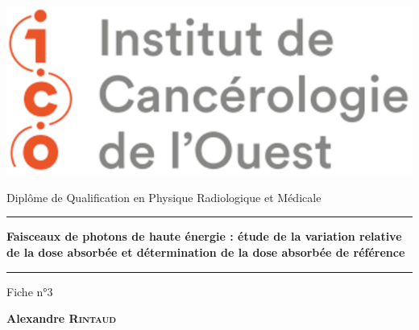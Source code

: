 \begin{titlepage}

    \unitlength 1cm
    \begin{center}
    
    \vspace*{1cm}
    

    \includegraphics[scale=0.6]{figures/logo_ico.png}
    
    \vspace{2cm}
    
               {\Large Diplôme de Qualification en Physique Radiologique et Médicale\\}
               
    \vspace{2cm}           
    
    
    \rule{16cm}{0.7pt}
    
    \vspace{12pt}
               
               {\LARGE \bf Faisceaux de photons de haute énergie : étude de la variation relative de la dose absorbée et détermination de la dose absorbée de référence\\}
               
    \vspace{12pt}
    \rule{16cm}{0.7pt}

    \vspace{2cm}

                {\large Fiche n°3}
    
    \vspace{1.5cm}

               {\Large\bf {Alexandre \textsc{Rintaud}}}
    

\end{center}
\end{titlepage}

